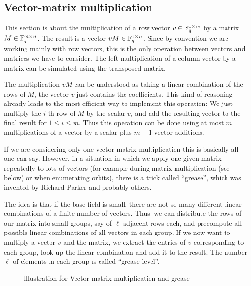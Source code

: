 \subsection{Vector-matrix multiplication}
\label{ssec:vecmat}

This section is about the multiplication of a row vector 
$v \in \mathbb{F}_q^{1 \times m}$ by a matrix $M \in \mathbb{F}_q^{m \times n}$. The result
is a vector $vM \in \mathbb{F}_q^{1 \times n}$. Since by convention we are working 
mainly with row vectors, this is the only operation between vectors
and matrices we have to consider. The left multiplication of a column
vector by a matrix can be simulated using the transposed matrix.

The multiplication $vM$ can be understood as taking a linear combination
of the rows of $M$, the vector $v$ just contains the coefficients. This
kind of reasoning already leads to the most efficient way to implement
this operation: We just multiply the $i$-th row of $M$ by the scalar
$v_i$ and add the resulting vector to the final result for $1 \le i \le m$.
Thus this operation can be done using at most $m$ multiplications
of a vector by a scalar plus $m-1$ vector additions.

If we are considering only one vector-matrix multiplication this is basically
all one can say. However, in a situation in which we apply one given
matrix repeatedly to lots of vectors (for example during matrix 
multiplication (see below) or when enumerating orbits), there is a
trick called ``grease'', which was invented by Richard Parker and 
probably others.

The idea is that if the base field is small, there are not so many
different linear combinations of a finite number of vectors. Thus,
we can distribute the rows of our matrix into small groups, say of
$\ell$ adjacent rows each, and precompute all possible linear combinations of
all vectors in each group. If we now want to multiply a vector $v$ and the 
matrix, we extract the entries of $v$ corresponding to each group,
look up the linear combination and add it to the result. The number
$\ell$ of elements in each group is called ``grease level''.

\begin{figure}[ht]
\begin{center}

\end{center}
\caption{Illustration for Vector-matrix multiplication and grease}
\label{grease}
\end{figure}

